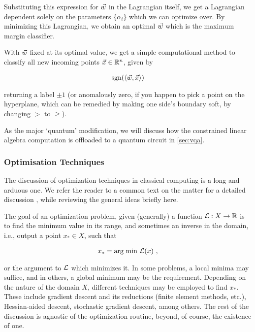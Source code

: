 Substituting this expression for \(\vec{w}\) in the Lagrangian itself, we get a
Lagrangian dependent solely on the parameters \(\{\alpha_i\}\) which we can
optimize over. By minimizing this Lagrangian, we obtain an optimal \(\vec{w}\)
which is the maximum margin classifier.

With \(\vec{w}\) fixed at its optimal value, we get a simple computational method
to classify all new incoming points \(\vec{x} \in \mathbb{R}^n\), given by

\begin{gather}
    \text{sgn}(\langle \vec{w}, \vec{x}\rangle)
    \label{eq:svmclassifier}
\end{gather}

returning a label \(\pm 1\) (or anomalously zero, if you happen to pick a point
on the hyperplane, which can be remedied by making one side's boundary soft, by
changing \(>\) to \(\geq\)).

As the major `quantum' modification, we will discuss how the constrained linear
algebra computation is offloaded to a quantum circuit in \autoref{sec:vqa}.

\subsubsection{Optimisation Techniques}
The discussion of optimization techniques in classical computing is a long and
arduous one. We refer the reader to a common text on the matter for a detailed
discussion \cite{boyd2004convex,nocedal2006numerical}, while reviewing the
general ideas briefly here.

The goal of an optimization problem, given (generally) a function
\(\mathcal{L}:X\to\mathbb{R}\) is to find the minimum value in its range, and sometimes an
inverse in the domain, i.e., output a point \(x_* \in X\), such that

\begin{gather*}
    x_* = \text{arg min } \mathcal{L}(x)~,
\end{gather*}

or the argument to \(\mathcal{L}\) which minimizes it. In some problems, a local
minima may suffice, and in others, a global minimum may be the requirement.
Depending on the nature of the domain \(X\), different techniques may be
employed to find \(x_*\). These include gradient descent and its reductions
(finite element methods, etc.), Hessian-aided descent,  stochastic gradient
descent, among others. The rest of the discussion is agnostic of the
optimization routine, beyond, of course, the existence of one.

